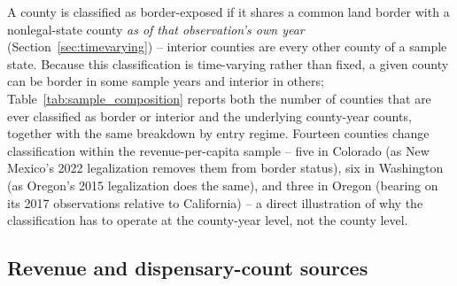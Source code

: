 \documentclass[12pt]{article}
\begin{document}
A county is classified as border-exposed if it shares a common land border with a nonlegal-state county
\emph{as of that observation's own year} (Section~\ref{sec:timevarying}) -- interior counties are every other
county of a sample state. Because this classification is time-varying rather than fixed, a given county can be
border in some sample years and interior in others; Table~\ref{tab:sample_composition} reports both the number
of counties that are ever classified as border or interior and the underlying county-year counts, together
with the same breakdown by entry regime. Fourteen counties change classification within the revenue-per-capita
sample -- five in Colorado (as New Mexico's 2022 legalization removes them from border status), six in
Washington (as Oregon's 2015 legalization does the same), and three in Oregon (bearing on its 2017
observations relative to California) -- a direct illustration of why the classification has to operate at
the county-year level, not the county level.



\subsection{Revenue and dispensary-count sources}
\label{sec:sources}
\end{document}

